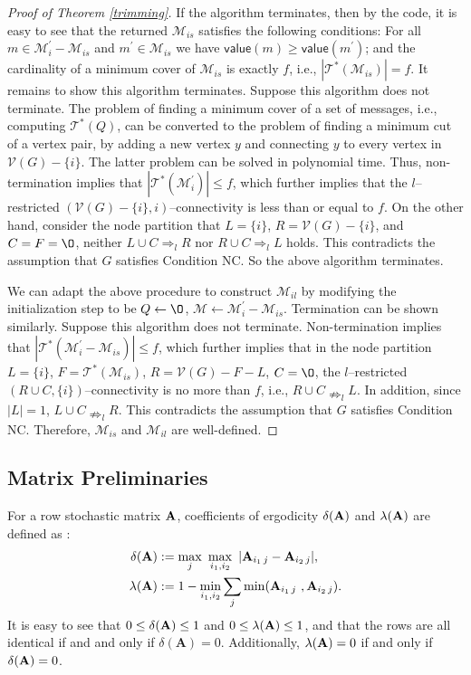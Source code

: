 \documentclass[letterpaper, 11pt]{article}
\newcommand{\calM}{{\mathcal{M}}}
\newcommand{\calT}{{\mathcal{T}}}
\newcommand{\calV}{{\mathcal{V}}}
\begin{document}
\begin{proof}[Proof of Theorem \ref{trimming}]
If the algorithm terminates, then by the code, it is easy to see that the returned $\calM_{is}$ satisfies the following conditions: For all $m\in \calM_i^{\prime}-\calM_{is}$ and $m^{\prime}\in \calM_{is}$ we have $\mathsf{value}(m)\ge \mathsf{value}(m^{\prime})$;
and the cardinality of a minimum cover of $\calM_{is}$ is exactly $f$, i.e., $|\calT^*(\calM_{is})|=f$.
It remains to show this algorithm terminates. Suppose this algorithm does not terminate.
The problem of finding a minimum cover of a set of messages, i.e., computing $\calT^*(Q)$, can be converted to the problem of finding a minimum cut of a vertex pair, by adding a new vertex $y$ and connecting $y$ to every vertex in $\calV(G)-\{i\}$. The latter problem can be solved in polynomial time. Thus, non-termination implies that $|\calT^*(\calM_i^{\prime})|\le f$, which further implies that
the $l$--restricted $(\calV(G)-\{i\}, i)$--connectivity is less than or equal to $f$. On the other hand, consider the node partition that $L=\{i\}$, $R=\calV(G)-\{i\}$, and $C=F=\O$, neither $L\cup C\Rightarrow_l R$ nor $R\cup C\Rightarrow_l L$ holds. This contradicts the assumption that $G$ satisfies Condition NC. So the above algorithm terminates.

We can adapt the above procedure to construct $\calM_{il}$ by modifying the initialization step to be $Q\gets \O$,  $\calM\gets \calM_i^{\prime}-\calM_{is}$.
Termination can be shown similarly. Suppose this algorithm does not terminate. Non-termination implies that $|\calT^*(\calM_i^{\prime}-\calM_{is})|\le f$, which further implies that in the node partition $L=\{i\}$, $F=\calT^*(\calM_{is})$, $R=\calV(G)-F-L$, $C=\O$, the $l$--restricted $(R\cup C, \{i\})$--connectivity is no more than $f$, i.e., $R\cup C\nRightarrow_l L$. In addition, since $|L|=1$, $L\cup C\nRightarrow_l R$. This contradicts the assumption that $G$ satisfies Condition NC.
Therefore, $\calM_{is}$ and $\calM_{il}$ are well-defined.


\end{proof}

\subsection{Matrix Preliminaries}\label{MatrixPreliminaries}




For a row stochastic matrix $\bf{A}$,
 coefficients of ergodicity $\delta(\bf{A})$ and $\lambda(\bf{A})$ are defined as
\cite{Wolfowitz}:
\begin{align}
\delta({\bf{A}}) & :=   \max_j ~ \max_{i_1,i_2}~ | {\bf{A}}_{i_1\,j}-{\bf{A}}_{i_2\,j} |, \label{e_delta} \\
\lambda({\bf{A}}) & :=  1 - \min_{i_1,i_2} \sum_j \min({\bf{A}}_{i_1\,j} ~, {\bf{A}}_{i_2\,j}). \label{e_lambda}
\end{align}
It  is easy to see that  $0\leq \delta({\bf{A}}) \leq 1$ and $0\leq \lambda({\bf{A}}) \leq 1$, and that the rows are all identical if and and only if $\delta(\textbf{A})=0$. Additionally, $\lambda({\bf{A}}) =0$ if and only if $\delta({\bf{A}}) = 0$.
\end{document}

